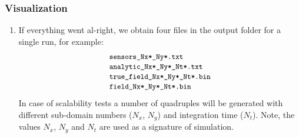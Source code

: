 \documentclass[]{article}
\begin{document}
\subsubsection{Visualization}\label{sec:visual}
\begin{enumerate}
\item If everything went al-right, we obtain four files in the output folder for a single run, for example:
$$
\begin{array}{l}
\mbox{\small\texttt{sensors\_Nx*\_Ny*.txt}} \\
\mbox{\small\texttt{analytic\_Nx*\_Ny*\_Nt*.txt}} \\
\mbox{\small\texttt{true\_field\_Nx*\_Ny*\_Nt*.bin}} \\
\mbox{\small\texttt{field\_Nx*\_Ny*\_Nt*.bin}}
\end{array}
$$
In case of scalability tests a number of quadruples will be generated with different sub-domain numbers ($N_x$, $N_y$) and integration time ($N_t$).
Note, the values $N_x$, $N_y$ and $N_t$ are used as a signature of simulation.


\end{enumerate}
\end{document}
